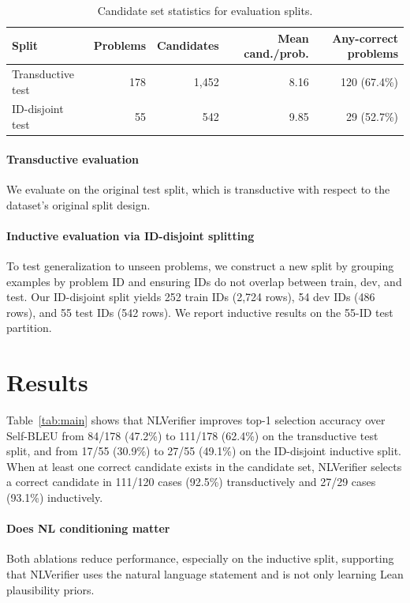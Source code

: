 \documentclass{article}
\begin{document}
\begin{table}[t]
\centering
\small
\caption{Candidate set statistics for evaluation splits.}
\label{tab:candstats}
\begin{tabular}{lrrrr}
\toprule
Split & Problems & Candidates & Mean cand./prob. & Any-correct problems \\
\midrule
Transductive test & 178 & 1{,}452 & 8.16 & 120 (67.4\%) \\
ID-disjoint test & 55 & 542 & 9.85 & 29 (52.7\%) \\
\bottomrule
\end{tabular}
\end{table}

\paragraph{Transductive evaluation}
We evaluate on the original test split, which is transductive with respect to the dataset's original split design.

\paragraph{Inductive evaluation via ID-disjoint splitting}
To test generalization to unseen problems, we construct a new split by grouping examples by problem ID and ensuring IDs do not overlap between train, dev, and test.
Our ID-disjoint split yields 252 train IDs (2{,}724 rows), 54 dev IDs (486 rows), and 55 test IDs (542 rows).
We report inductive results on the 55-ID test partition.

\section{Results}


Table~\ref{tab:main} shows that NLVerifier improves top-1 selection accuracy over Self-BLEU
from 84/178 (47.2\%) to 111/178 (62.4\%) on the transductive test split, and from 17/55 (30.9\%) to 27/55 (49.1\%) on the ID-disjoint inductive split.
When at least one correct candidate exists in the candidate set, NLVerifier selects a correct candidate
in 111/120 cases (92.5\%) transductively and 27/29 cases (93.1\%) inductively.

\paragraph{Does NL conditioning matter}
Both ablations reduce performance, especially on the inductive split, supporting that NLVerifier uses the natural language statement and is not only learning Lean plausibility priors.
\end{document}
